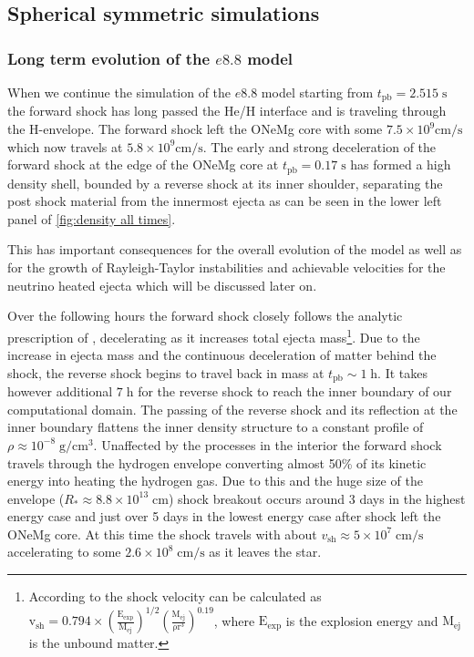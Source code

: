 \documentclass[fleqn,usenatbib]{mnras}
\newcommand{\tpb}{\ensuremath{t_{\text{pb}}}}
\begin{document}
\subsection{Spherical symmetric simulations}
\subsubsection{Long term evolution of the $e8.8$ model}

When we continue the simulation of the $e8.8$ model starting from $t_{\mathrm{pb}}=2.515\;\mathrm{s}$ the forward shock has long passed the He/H interface and is traveling through the H-envelope. The forward shock left the ONeMg core with some $7.5\times 10^{9}\mathrm{cm/s}$ which now travels at $5.8\times 10^{9}\mathrm{cm/s}$. The early and strong deceleration of the forward shock at the edge of the ONeMg core at $t_{\mathrm{pb}}=0.17\;\mathrm{s}$ has formed a high density shell, bounded by a reverse shock at its inner shoulder, separating the post shock material from the innermost ejecta as can be seen in the lower left panel of \autoref{fig:density all times}.

This has important consequences for the overall evolution of the model as well as for the growth of Rayleigh-Taylor instabilities and achievable velocities for the neutrino heated ejecta which will be discussed later on.

Over the following hours the forward shock closely follows the analytic prescription of \citet{Matzner1998}, decelerating as it increases total ejecta mass\footnote{According to \citet{Matzner1998} the shock velocity can be calculated as $\mathrm{v_{sh}=0.794\times(\frac{E_{exp}}{M_{ej}})^{1/2}(\frac{M_{ej}}{\rho r^3})^{0.19}}$, where $\mathrm{E_{exp}}$ is the explosion energy and $\mathrm{M_{ej}}$ is the unbound matter.}. Due to the increase in ejecta mass and the continuous deceleration of matter behind the shock, the reverse shock begins to travel back in mass at  $\tpb\sim 1\;\mathrm{h}$. It takes however additional $7\;\mathrm{h}$ for the reverse shock to reach the inner boundary of our computational domain. 
The passing of the reverse shock and its reflection at the inner boundary flattens the inner density structure to a constant profile of $\rho\approx 10^{-8}\;\mathrm{g/cm^3}$.
Unaffected by the processes in the interior the forward shock travels through the hydrogen envelope converting almost 50\% of its kinetic energy into heating the hydrogen gas. Due to this and the huge size of the envelope ($R_{*}\approx8.8\times10^{13}\;\mathrm{cm}$) shock breakout occurs around 3 days in the highest energy case and just over 5 days in the lowest energy case after shock left the ONeMg core. At this time the shock travels with about $v_{\mathrm{sh}}\approx 5\times 10^{7}\; \mathrm{cm/s}$ accelerating to some $2.6\times 10^{8}\; \mathrm{cm/s}$ as it leaves the star.
\end{document}
